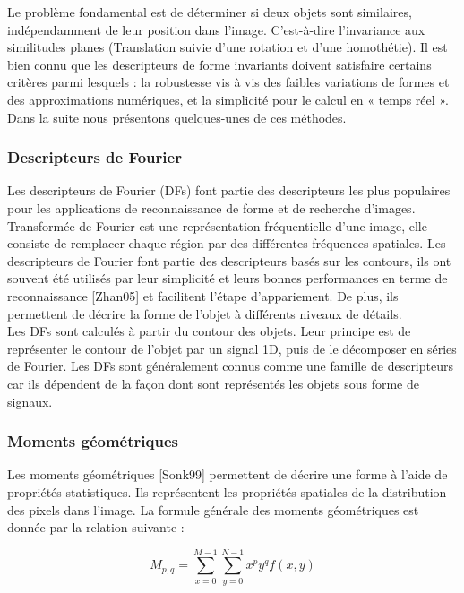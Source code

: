 Le problème fondamental est de déterminer si deux objets sont similaires, indépendamment
de leur position dans l’image. C’est-à-dire l’invariance aux similitudes planes (Translation suivie d'une rotation et d’une homothétie). Il est bien connu que les descripteurs de forme invariants doivent satisfaire certains critères parmi lesquels : la robustesse vis à vis des faibles variations de formes et des approximations numériques, et la simplicité pour le calcul en « temps réel ».\\

Dans la suite nous présentons quelques-unes de ces méthodes.

\subsubsection{Descripteurs de Fourier}
Les descripteurs de Fourier (DFs) font partie des descripteurs les plus populaires pour les applications de reconnaissance de forme et de recherche d'images. Transformée de Fourier est une représentation fréquentielle d’une image, elle consiste de remplacer chaque région par des différentes fréquences spatiales. Les descripteurs de Fourier font partie des descripteurs basés sur les contours, ils ont souvent été utilisés par leur simplicité et leurs bonnes performances en terme de reconnaissance [Zhan05] et facilitent l'étape d’appariement. De plus, ils permettent de décrire la forme de l’objet à différents niveaux de détails.\\

Les DFs sont calculés à partir du contour des objets. Leur principe est de représenter le contour de l'objet par un signal 1D, puis de le décomposer en séries de Fourier. Les DFs sont généralement connus comme une famille de descripteurs car ils dépendent de la façon dont sont représentés les objets sous forme de signaux.

\subsubsection{Moments géométriques}
Les moments géométriques [Sonk99] permettent de décrire une forme à l’aide de propriétés
statistiques. Ils représentent les propriétés spatiales de la distribution des pixels dans l’image. La formule générale des moments géométriques est donnée par la relation suivante :

\begin{equation}
	M_{p,q} = \sum_{x=0}^{M-1}\sum_{y=0}^{N-1} x^p y^q f(x, y)
\end{equation}

